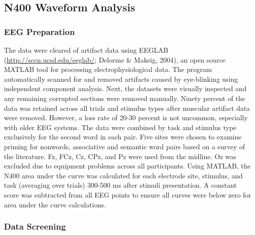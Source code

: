 \documentclass[english,man]{apa6}
\theoremstyle{definition}
\theoremstyle{definition}
\theoremstyle{definition}
\theoremstyle{remark}
\begin{document}
\subsection{N400 Waveform Analysis}\label{n400-waveform-analysis}

\subsubsection{EEG Preparation}\label{eeg-preparation}

The data were cleared of artifact data using EEGLAB
(\url{http://sccn.ucsd.edu/eeglab/}; Delorme \& Makeig, 2004), an open
source MATLAB tool for processing electrophysiological data. The program
automatically scanned for and removed artifacts caused by eye-blinking
using independent component analysis. Next, the datasets were visually
inspected and any remaining corrupted sections were removed manually.
Ninety percent of the data was retained across all trials and stimulus
types after muscular artifact data were removed. However, a loss rate of
20-30 percent is not uncommon, especially with older EEG systems. The
data were combined by task and stimulus type exclusively for the second
word in each pair. Five sites were chosen to examine priming for
nonwords, associative and semantic word pairs based on a survey of the
literature. Fz, FCz, Cz, CPz, and Pz were used from the midline. Oz was
excluded due to equipment problems across all participants. Using
MATLAB, the N400 area under the curve was calculated for each electrode
site, stimulus, and task (averaging over trials) 300-500 ms after
stimuli presentation. A constant score was subtracted from all EEG
points to ensure all curves were below zero for area under the curve
calculations.

\subsubsection{Data Screening}\label{data-screening}
\end{document}
